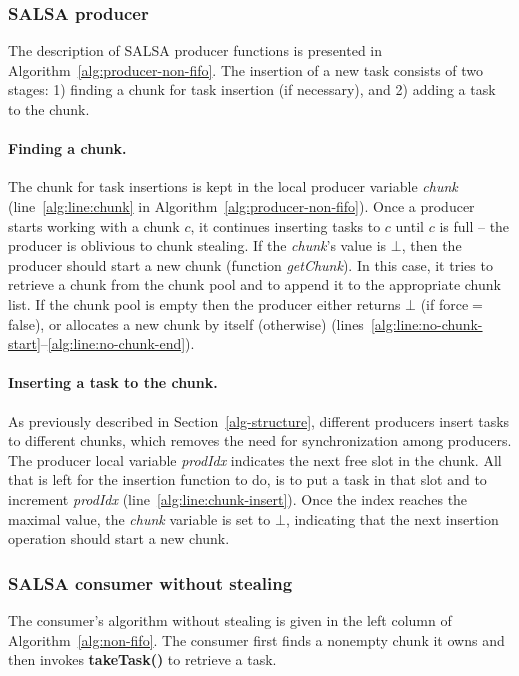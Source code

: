 \subsubsection {SALSA producer}

\negspace
The description of SALSA producer functions is presented in Algorithm~\ref{alg:producer-non-fifo}. 
The insertion of a new task consists of two stages: 
1) finding a chunk for task insertion (if necessary), and 2) adding a task to the chunk. 
\negspace
\paragraph {Finding a chunk.}
The chunk for task insertions is kept in the local producer variable \emph{chunk} (line~\ref{alg:line:chunk} in Algorithm~\ref{alg:producer-non-fifo}). 
Once a producer starts working with a chunk $c$, it continues inserting tasks to $c$ until $c$ is full -- 
the producer is oblivious to chunk stealing. 
If the \emph{chunk}'s value is $\bot$, then the producer should start a new chunk (function \emph{getChunk}). 
In this case, it tries to retrieve a chunk from the chunk pool and to append it to the appropriate chunk list. If the chunk pool is empty then the producer either returns $\bot$ (if force$=$false), or allocates a new chunk by itself (otherwise) (lines~\ref{alg:line:no-chunk-start}--\ref{alg:line:no-chunk-end}). 
\negspace
\paragraph {Inserting a task to the chunk.}
As previously described in Section~\ref{alg-structure}, different producers insert tasks to different chunks, which removes the need for synchronization among producers. 
The producer local variable \emph{prodIdx} indicates the next free slot in the chunk.
All that is left for the insertion function to do, is to put a task in that slot and to increment \emph{prodIdx} (line~\ref{alg:line:chunk-insert}).
Once the index reaches the maximal value, the \emph{chunk} variable is set to $\bot$, indicating that the next insertion operation should start a new chunk. 
\negspace
\subsubsection {SALSA consumer without stealing}

The consumer's algorithm without stealing is given in the left column of Algorithm~\ref{alg:non-fifo}.
The consumer first finds a nonempty chunk it owns and then invokes {\bf takeTask()} to retrieve a task.

